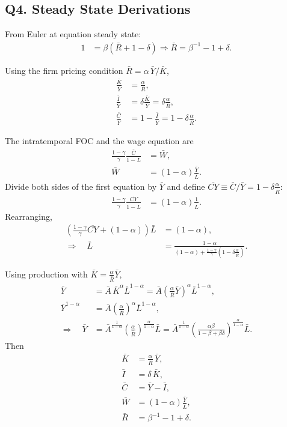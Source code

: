 \documentclass[a4paper,12pt]{article} %
\theoremstyle{nonitalic}
\begin{document}
\subsection*{Q4. Steady State Derivations}
From Euler at equation steady state:
\begin{align}
1 &= \beta(\bar R+1-\delta)
\Rightarrow \bar R = \beta^{-1}-1+\delta.
\end{align}

Using the firm pricing condition $\bar R=\alpha\,\bar Y/\bar K$,
\begin{align}
\frac{\bar K}{\bar Y} &= \frac{\alpha}{\bar R}, \\
\frac{\bar I}{\bar Y} &= \delta\frac{\bar K}{\bar Y}=\delta\frac{\alpha}{\bar R}, \\
\frac{\bar C}{\bar Y} &= 1-\frac{\bar I}{\bar Y}
= 1-\delta\frac{\alpha}{\bar R}.
\end{align}

The intratemporal FOC and the wage equation are
\begin{align}
\frac{1-\gamma}{\gamma}\frac{\bar C}{1-\bar L} &= \bar W, \\
\bar W &= (1-\alpha)\frac{\bar Y}{\bar L}.
\end{align}
Divide both sides of the first equation by $\bar Y$ and define
$\overline{CY}\equiv \bar C/\bar Y=1-\delta\frac{\alpha}{\bar R}$:
\begin{align}
\frac{1-\gamma}{\gamma}\frac{\overline{CY}}{1-\bar L} &= (1-\alpha)\frac{1}{\bar L}.
\end{align}
Rearranging,
\begin{align}
\left(\frac{1-\gamma}{\gamma}\overline{CY} + (1-\alpha) \right)\bar L &= (1-\alpha), \\
\Rightarrow\quad
\bar L &= \frac{1-\alpha}{(1-\alpha) + \frac{1-\gamma}{\gamma}\left(1-\delta\frac{\alpha}{\bar R}\right)}.
\end{align}

Using production with $\bar K=\tfrac{\alpha}{\bar R}\bar Y$,
\begin{align}
\bar Y &= \bar A\,\bar K^{\alpha}\bar L^{1-\alpha}
       = \bar A\left(\tfrac{\alpha}{\bar R}\bar Y\right)^{\alpha}\bar L^{1-\alpha}, \\
\bar Y^{1-\alpha} &= \bar A\left(\tfrac{\alpha}{\bar R}\right)^{\alpha}\bar L^{1-\alpha}, \\
\Rightarrow\quad
\bar Y &= \bar A^{\tfrac{1}{1-\alpha}}
\left(\frac{\alpha}{\bar R}\right)^{\tfrac{\alpha}{1-\alpha}}
\bar L = \bar A^{\frac{1}{1-\alpha}}\left(\frac{\alpha \beta}{1 - \beta + \beta \delta}\right)^{\frac{\alpha}{1-\alpha}}\bar L.
\end{align}
Then
\begin{align}
\bar K &= \frac{\alpha}{\bar R}\,\bar Y, \\
\bar I &= \delta\,\bar K, \\
\bar C &= \bar Y - \bar I, \\
\bar W &= (1-\alpha)\frac{\bar Y}{\bar L}, \\
\bar R &= \beta^{-1}-1+\delta.
\end{align}
\end{document}
